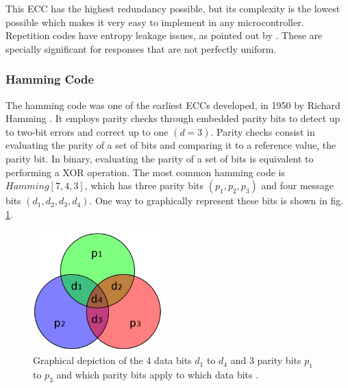 This ECC has the highest redundancy possible, but its complexity is the lowest possible which makes it very easy to implement in any microcontroller. Repetition codes have entropy leakage issues, as pointed out by \cite{Delvaux2015,Koeberl2014}. These are specially significant for responses that are not perfectly uniform. 

\subsubsection{Hamming Code}

The hamming code was one of the earliest ECCs developed, in 1950 by Richard Hamming \cite{Hamming50}.  It employs parity checks through embedded parity bits to detect up to two-bit errors and correct up to one $(d=3)$. Parity checks consist in evaluating the parity of a set of bits and comparing it to a reference value, the parity bit. In binary, evaluating the parity of a set of bits is equivalent to performing a XOR operation. The most common hamming code is $Hamming[7,4,3]$, which has three parity bits $(p_1,p_2,p_3)$ and four message bits $(d_1,d_2,d_3,d_4)$. One way to graphically represent these bits is shown in fig. \ref{fig:HammingVenn}. 

\begin{figure}[H]
    \centering
    \includegraphics[width=5cm]{images/HammingVenn.png}
    \caption{Graphical depiction of the 4 data bits $d_1$ to $d_4$ and 3 parity bits $p_1$ to $p_3$ and which parity bits apply to which data bits \cite{Hammingwiki}.}
    \label{fig:HammingVenn}
\end{figure}



